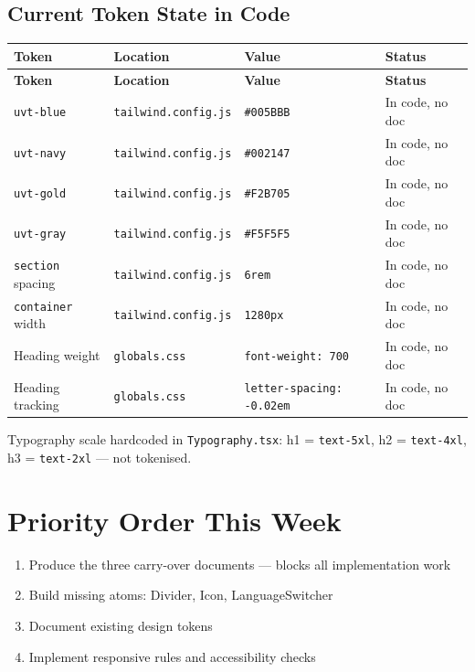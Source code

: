 \documentclass[12pt,a4paper]{article}
\begin{document}
\subsection{Current Token State in Code}

\begin{longtable}{@{}llll@{}}
\toprule
\rowcolor{uvtLightBlue}
\textbf{Token} & \textbf{Location} & \textbf{Value} & \textbf{Status} \\
\midrule
\endfirsthead
\toprule
\rowcolor{uvtLightBlue}
\textbf{Token} & \textbf{Location} & \textbf{Value} & \textbf{Status} \\
\midrule
\endhead
\bottomrule
\endfoot
\texttt{uvt-blue} & \texttt{tailwind.config.js} & \texttt{\#005BBB} & In code, no doc \\
\texttt{uvt-navy} & \texttt{tailwind.config.js} & \texttt{\#002147} & In code, no doc \\
\texttt{uvt-gold} & \texttt{tailwind.config.js} & \texttt{\#F2B705} & In code, no doc \\
\texttt{uvt-gray} & \texttt{tailwind.config.js} & \texttt{\#F5F5F5} & In code, no doc \\
\texttt{section} spacing & \texttt{tailwind.config.js} & \texttt{6rem} & In code, no doc \\
\texttt{container} width & \texttt{tailwind.config.js} & \texttt{1280px} & In code, no doc \\
Heading weight & \texttt{globals.css} & \texttt{font-weight: 700} & In code, no doc \\
Heading tracking & \texttt{globals.css} & \texttt{letter-spacing: -0.02em} & In code, no doc \\
\end{longtable}

Typography scale hardcoded in \texttt{Typography.tsx}: h1 = \texttt{text-5xl}, h2 = \texttt{text-4xl},
h3 = \texttt{text-2xl} --- not tokenised.

\section{Priority Order This Week}

\begin{enumerate}
    \item Produce the three carry-over documents --- blocks all implementation work
    \item Build missing atoms: Divider, Icon, LanguageSwitcher
    \item Document existing design tokens
    \item Implement responsive rules and accessibility checks
\end{enumerate}
\end{document}
